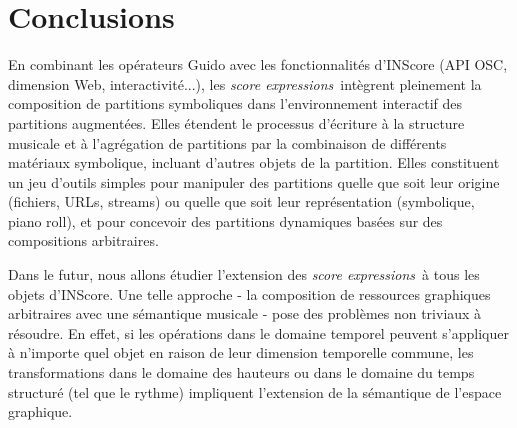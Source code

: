 \documentclass{article}
\newcommand{\sExprs}{\emph{score expressions}}
\begin{document}
\section{Conclusions}

En combinant les opérateurs Guido avec les fonctionnalités d'INScore (API OSC, dimension Web, interactivité...), les \sExprs\ intègrent pleinement la composition de partitions symboliques dans l'environnement interactif des partitions augmentées. Elles étendent le processus d'écriture à la structure musicale et à l'agrégation de partitions par la combinaison de différents matériaux symbolique, incluant d'autres objets de la partition. Elles constituent un jeu d'outils simples pour manipuler des partitions quelle que soit leur origine (fichiers, URLs, streams) ou quelle que soit leur représentation (symbolique, piano roll), et pour concevoir des partitions dynamiques basées sur des compositions arbitraires.

Dans le futur, nous allons étudier l'extension des \sExprs\ à tous les objets d'INScore. Une telle approche - la composition de ressources graphiques arbitraires avec une sémantique musicale - pose des problèmes non triviaux à résoudre. En effet, si les opérations dans le domaine temporel peuvent s'appliquer à n'importe quel objet en raison de leur dimension temporelle commune, les transformations dans le domaine des hauteurs ou dans le domaine du temps structuré (tel que le rythme) impliquent l'extension de la sémantique de l'espace graphique.

\balance


\end{document}
